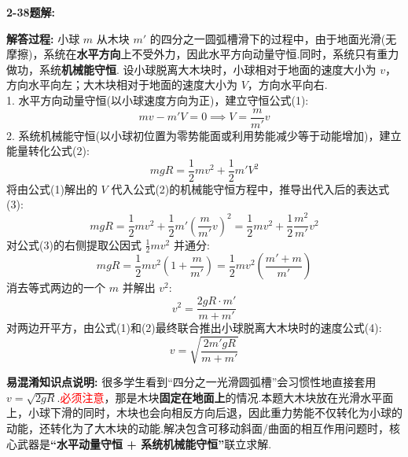 \vspace{2em}

\textbf{2-38题解:}


\textbf{解答过程:}
小球 $m$ 从木块 $m'$ 的四分之一圆弧槽滑下的过程中，由于地面光滑(无摩擦)，系统在\textbf{水平方向}上不受外力，因此水平方向动量守恒.同时，系统只有重力做功，系统\textbf{机械能守恒}.
设小球脱离大木块时，小球相对于地面的速度大小为 $v$，方向水平向左；大木块相对于地面的速度大小为 $V$，方向水平向右.\\
1. 水平方向动量守恒(以小球速度方向为正)，建立守恒公式(1):
\begin{equation}
	mv - m'V = 0 \implies V = \frac{m}{m'}v
\end{equation}
2. 系统机械能守恒(以小球初位置为零势能面或利用势能减少等于动能增加)，建立能量转化公式(2):
\begin{equation}
	mgR = \frac{1}{2}mv^2 + \frac{1}{2}m'V^2
\end{equation}
将由公式(1)解出的 $V$ 代入公式(2)的机械能守恒方程中，推导出代入后的表达式(3):
\begin{equation}
	mgR = \frac{1}{2}mv^2 + \frac{1}{2}m'\left(\frac{m}{m'}v\right)^2 = \frac{1}{2}mv^2 + \frac{1}{2}\frac{m^2}{m'}v^2
\end{equation}
对公式(3)的右侧提取公因式 $\frac{1}{2}mv^2$ 并通分:
$$mgR = \frac{1}{2}mv^2 \left(1 + \frac{m}{m'}\right) = \frac{1}{2}mv^2 \left(\frac{m' + m}{m'}\right)$$
消去等式两边的一个 $m$ 并解出 $v^2$:
$$v^2 = \frac{2gR \cdot m'}{m + m'}$$
对两边开平方，由公式(1)和(2)最终联合推出小球脱离大木块时的速度公式(4):
\begin{equation}
	v = \sqrt{\frac{2m'gR}{m + m'}}
\end{equation}

\textbf{易混淆知识点说明:}
很多学生看到“四分之一光滑圆弧槽”会习惯性地直接套用 $v = \sqrt{2gR}$.\textcolor{red}{必须注意}，那是木块\textbf{固定在地面上}的情况.本题大木块放在光滑水平面上，小球下滑的同时，木块也会向相反方向后退，因此重力势能不仅转化为小球的动能，还转化为了大木块的动能.解决包含可移动斜面/曲面的相互作用问题时，核心武器是\textbf{“水平动量守恒 + 系统机械能守恒”}联立求解.
\newpage

